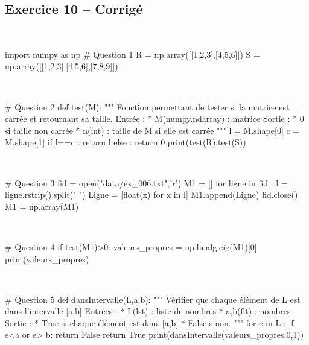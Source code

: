 \documentclass[10pt,fleqn]{article} %
\begin{document}
\begin{multicols}{2}
\subsection*{Exercice 10 -- Corrigé}
\begin{corrige}
$\quad$
\begin{python}
import numpy as np
# Question 1
R = np.array([[1,2,3],[4,5,6]])
S = np.array([[1,2,3],[4,5,6],[7,8,9]])
\end{python}
\end{corrige}

\begin{corrige}
$\quad$
\begin{python}
# Question 2
def test(M):
    """
    Fonction permettant de tester si la
    matrice est carrée et retournant sa taille.
    Entrée : 
     * M(numpy.ndarray) : matrice
    Sortie :
     * 0 si taille non carrée
     * n(int) : taille de M si elle est carrée
    """
    l = M.shape[0]
    c = M.shape[1]
    if l==c :
        return l
    else : 
        return 0
print(test(R),test(S))
\end{python}
\end{corrige}

\begin{corrige}
$\quad$
\begin{python}
# Question 3
fid = open("data/ex_006.txt",'r')
M1 = []
for ligne in fid :
    l = ligne.rstrip().split(" ")
    Ligne = [float(x) for x in l]
    M1.append(Ligne)
fid.close()
M1 = np.array(M1)
\end{python}
\end{corrige}

\begin{corrige}
$\quad$
\begin{python}
# Question 4
if test(M1)>0:
    valeurs_propres = np.linalg.eig(M1)[0]
    print(valeurs_propres)
\end{python}
\end{corrige}

\begin{corrige}
$\quad$
\begin{python}
# Question 5
def dansIntervalle(L,a,b):
    """
    Vérifier que chaque élément de L est dans 
    l'intervalle [a,b]
    Entrées : 
     * L(lst) : liste de nombres
     * a,b(flt) : nombres
    Sortie : 
     * True si chaque élément est dans [a,b]
     * False sinon. 
    """   
    for e in L :
        if e<a or e> b:
            return False
    return True
print(dansIntervalle(valeurs_propres,0,1))
\end{python}
\end{corrige}


\end{multicols}
\end{document}
